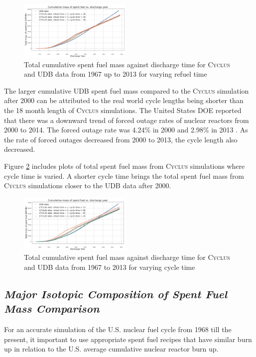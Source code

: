 \documentclass{anstrans}
\newcommand{\Cyclus}{\textsc{Cyclus}\xspace}%
\begin{document}
\begin{figure}[h] 
	\centering
	\includegraphics[width=0.48\textwidth]{total_cumulative_mass_spent_fuel_refueltime}
	\caption{Total cumulative spent fuel mass against discharge time for \Cyclus and UDB data from 1967 up to 2013 for varying refuel time}
	\label{fig:total_refueltime}
\end{figure} 

The larger cumulative UDB spent fuel mass compared to the \Cyclus simulation after 2000 can be attributed to the real world cycle lengths being shorter than the 18 month length of \Cyclus simulations. The United States DOE reported that there was a downward trend of forced outage rates of nuclear reactors from 2000 to 2014. The forced outage rate was 4.24\% in 2000 and 2.98\% in 2013 \cite{gehin_nuclear_2016}. As the rate of forced outages decreased from 2000 to 2013, the cycle length also decreased. 

Figure \ref{fig:total_cycletime} includes plots of total spent fuel mass from \Cyclus simulations where cycle time is varied. A shorter cycle time brings the total spent fuel mass from \Cyclus simulations closer to the UDB data after 2000. 

\begin{figure}[h] %
	\centering
	\includegraphics[width=0.48\textwidth]{total_cumulative_mass_spent_fuel_cycletime}
	\caption{Total cumulative spent fuel mass against discharge time for \Cyclus and UDB data from 1967 to 2013 for varying cycle time}
	\label{fig:total_cycletime}
\end{figure} 

\subsection{\textit{Major Isotopic Composition of  Spent Fuel Mass Comparison}}
For an accurate simulation of the U.S. nuclear fuel cycle from 1968 till the present, it important to use appropriate spent fuel recipes that have similar burn up in relation to the U.S. average cumulative nuclear reactor burn up. 
\end{document}
